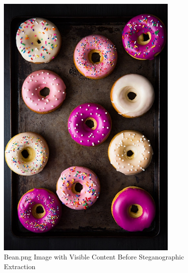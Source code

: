 \begin{figure}[htbp]
    \centering
    \includegraphics[width=0.8\textwidth]{images/Artifact and Evidence Recovery/bean_recipe.png}
    \caption{Bean.png Image with Visible Content Before Steganographic Extraction}
    \label{fig:bean_image}
\end{figure}

